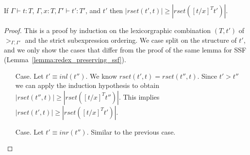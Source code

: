 \begin{lemma}
  \label{lemma:redex_preserving_ssfp}
  \small
  If $\Gamma \vdash t : T$, $\Gamma, x:T, \Gamma' \vdash t':T'$, and
  $t'$ then $|rset(t', t)| \geq |rset([t/x]^T t')|$.
\end{lemma}
\begin{proof}
  This is a proof by induction on the lexicorgraphic combination
  $(T, t')$ of $>_{\Gamma,\Gamma'}$ and the strict subexpression
  ordering.  We case split on the structure of $t'$, and we only show
  the cases that differ from the proof of the same lemma for SSF
  (Lemma~\ref{lemma:redex_preserving_ssf}).
\begin{itemize}  
  
\item[Case.] Let $t' \equiv inl(t'')$. We know $rset(t', t) = rset(t'', t)$.  Since $t' > t''$ we can apply
  the induction hypothesis to obtain $|rset(t'', t)| \geq |rset([t/x]^T t'')|$.  This implies
  $|rset(t', t)| \geq |rset([t/x]^T t')|$.
  
\item[Case.] Let $t' \equiv inr(t'')$. Similar to the previous case.  
  

\end{itemize}
\end{proof}
